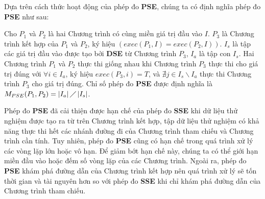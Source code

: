 Dựa trên cách thức hoạt động của phép đo \textbf{PSE}, chúng ta có định nghĩa phép đo \textbf{PSE} như sau:
\begin{definition}
	Cho $P_{1}$ và $P_{2}$ là hai Chương trình có cùng miền giá trị đầu vào $I$. $P_{3}$ là Chương trình
	kết hợp của $P_{1}$ và $P_{2}$, ký hiệu $(exec(P_{1}, I) =  exec(P_{2}, I))$.  $I_{s}$ là tập các giá trị đầu vào được tạo bởi \textbf{DSE} từ Chương trình $P_{3}$, $I_{a}$ là tập con $I_{s}$. Hai Chương trình $P_{1}$ và $P_{2}$ thực thi giống nhau khi Chương trình $P_{3}$ thực thi cho giá trị đúng với $\forall i \in I_{a}$, ký hiệu $exec(P_{3}, i) = T$, và $\nexists j \in I_{s} \backslash I_{a}$ thực thi Chương trình $P_{3}$ cho giá trị đúng. Chỉ số phép đo \textbf{PSE} được định nghĩa là $M_{PSE}(P_{1}, P_{2}) = \left|I_{a}\right| \diagup \left|I_{s}\right| $.
\end{definition}
Phép đo \textbf{PSE} đã cải thiện được hạn chế của phép đo \textbf{SSE} khi dữ liệu thử nghiệm được  tạo ra từ trên Chương trình kết hợp, tập dữ liệu thử nghiệm có khả năng thực thi hết các nhánh đường đi của Chương trình tham chiếu và Chương trình cần tính. Tuy nhiên, phép đo \textbf{PSE} cũng có hạn chế trong quá trình xử lý các vòng lặp lớn hoặc vô hạn. Để giảm bớt hạn chế này, chúng ta có thể giới hạn miền đầu vào hoặc đếm số vòng lặp của các Chương trình. Ngoài ra, phép đo \textbf{PSE} khám phá đường dẫn của Chương trình kết hợp nên quá trình xử lý sẽ tốn thời gian và tài nguyên hơn so với phép đo \textbf{SSE} khi chỉ khám phá đường dẫn của Chương trình tham chiếu.
